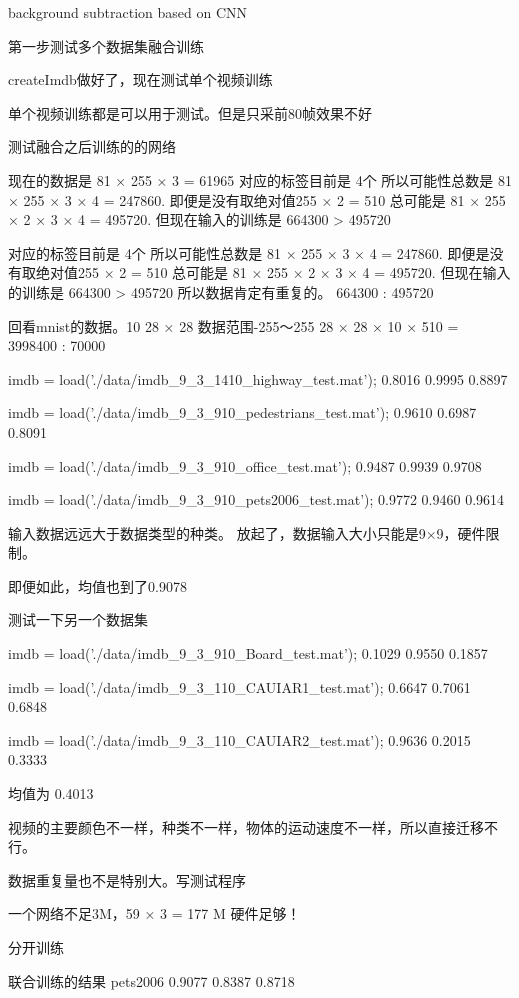 background subtraction based on CNN

第一步测试多个数据集融合训练

createImdb做好了，现在测试单个视频训练

单个视频训练都是可以用于测试。但是只采前80帧效果不好

测试融合之后训练的的网络

现在的数据是 81 × 255 × 3 = 61965
对应的标签目前是 4个
所以可能性总数是 81 × 255 × 3 × 4 = 247860.
即便是没有取绝对值255 × 2 = 510
总可能是 81 × 255 × 2 × 3 × 4 = 495720.
但现在输入的训练是 664300 > 495720

对应的标签目前是 4个
所以可能性总数是 81 × 255 × 3 × 4 = 247860.
即便是没有取绝对值255 × 2 = 510
总可能是 81 × 255 × 2 × 3 × 4 = 495720.
但现在输入的训练是 664300 > 495720
所以数据肯定有重复的。 
664300 : 495720

回看mnist的数据。10 28 × 28 数据范围-255～255
28 × 28 × 10 × 510 = 
3998400 : 70000

imdb = load('./data/imdb_9_3_1410_highway_test.mat');
   0.8016    0.9995    0.8897

imdb = load('./data/imdb_9_3_910_pedestrians_test.mat');
    0.9610    0.6987    0.8091

imdb = load('./data/imdb_9_3_910_office_test.mat');
    0.9487    0.9939    0.9708

imdb = load('./data/imdb_9_3_910_pets2006_test.mat');
    0.9772    0.9460    0.9614

输入数据远远大于数据类型的种类。
放起了，数据输入大小只能是9×9，硬件限制。

即便如此，均值也到了0.9078

测试一下另一个数据集


imdb = load('./data/imdb_9_3_910_Board_test.mat');
    0.1029    0.9550    0.1857

imdb = load('./data/imdb_9_3_110_CAUIAR1_test.mat');
    0.6647    0.7061    0.6848

imdb = load('./data/imdb_9_3_110_CAUIAR2_test.mat');
    0.9636    0.2015    0.3333

均值为 0.4013

视频的主要颜色不一样，种类不一样，物体的运动速度不一样，所以直接迁移不行。

数据重复量也不是特别大。写测试程序

一个网络不足3M，59 × 3 = 177 M 硬件足够！

分开训练


联合训练的结果
pets2006
    0.9077    0.8387    0.8718

